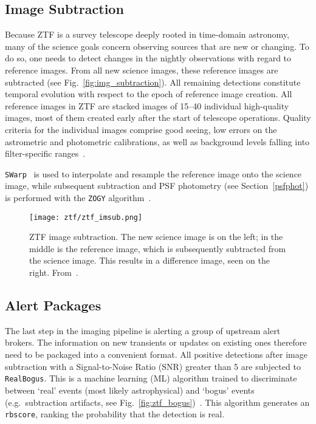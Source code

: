 \subsection{Image Subtraction}\label{ztf_image_subtraction}
Because ZTF is a survey telescope deeply rooted in time-domain astronomy, many of the science goals concern observing sources that are new or changing. To do so, one needs to detect changes in the nightly observations with regard to reference images. From all new science images, these reference images are subtracted (see Fig.~\ref{fig:img_subtraction}). All remaining detections constitute temporal evolution with respect to the epoch of reference image creation. All reference images in ZTF are stacked images of 15--40 individual high-quality images, most of them created early after the start of telescope operations. Quality criteria for the individual images comprise good seeing, low errors on the astrometric and photometric calibrations, as well as background levels falling into filter-specific ranges~\cite{Masci2019}.

\texttt{SWarp}~ is used to interpolate and resample the reference image onto the science image, while subsequent subtraction and PSF photometry (see Section~\ref{psfphot}) is performed with the \texttt{ZOGY} algorithm~.

\begin{figure}[h!]
    \texttt{[image: ztf/ztf\_imsub.png]}
    \caption[ZTF image subtraction]{ZTF image subtraction. The new science image is on the left; in the middle is the reference image, which is subsequently subtracted from the science image. This results in a difference image, seen on the right. From~\cite{Mahabal2019}.}
\end{figure}

\subsection{Alert Packages}\label{ztf_alerts}

The last step in the imaging pipeline is alerting a group of upstream alert brokers. The information on new transients or updates on existing ones therefore need to be packaged into a convenient format. All positive detections after image subtraction with a Signal-to-Noise Ratio (SNR) greater than 5 are subjected to \texttt{RealBogus}. This is a machine learning (ML) algorithm trained to discriminate between `real' events (most likely astrophysical) and `bogus' events (e.g.\ subtraction artifacts, see Fig.~\ref{fig:ztf_bogus})~. This algorithm generates an \texttt{rbscore}, ranking the probability that the detection is real.

